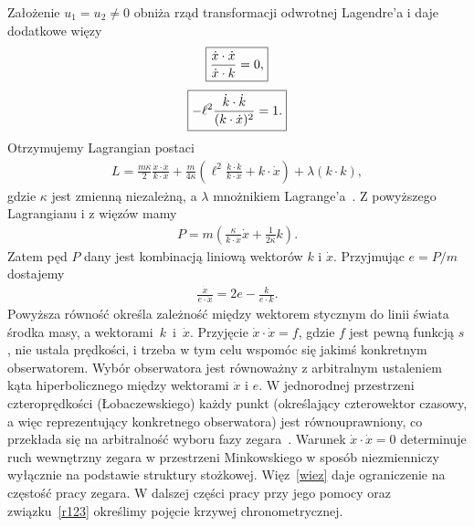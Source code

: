 Założenie 
$u_1 = u_2 \neq 0$ obniża rząd transformacji 
odwrotnej Lagendre'a i daje dodatkowe więzy 
\begin{align}\boxed{
\label{wiezD}
\frac{\dot{x}\cdot\dot{x}}{\dot{x}\cdot k}=0, 
}
\end{align}
\begin{align} 
\boxed{
\label{wiez}
 - \ell^2 \frac{\dot{k} \cdot \dot{k}}{ ( k \cdot \dot{x})^2 } = 1 .
}
\end{align}
Otrzymujemy Lagrangian postaci
\begin{align*}\boxed{
L  = \frac{m \kappa}{2} \frac{\dot{x}\cdot\dot{x}}{k\cdot\dot{x}}
+ \frac{m }{4 \kappa} 
 \left( \ell^2 \frac{\dot{k} \cdot \dot{k}}{  k \cdot \dot{x} } + 
k\cdot\dot{x} \right) + \lambda (k\cdot k),}
\end{align*}
gdzie $\kappa $ jest zmienną niezależną, a $\lambda$ 
mnożnikiem Lagrange'a~\cite{Bratek2015wiele}.
Z powyższego Lagrangianu i z więzów mamy
\begin{align*}
P = m \left( \frac{\kappa}{k\cdot \dot{x}} \dot{x}+ \frac{1}{2\kappa} k\right).
\end{align*}
Zatem pęd $P$ dany jest kombinacją liniową wektorów $k$ i $\dot{x}$. Przyjmując
$e=P/m$ dostajemy
\begin{align}\label{r123}
\frac{\dot{x}}{e\cdot \dot{x}} = 
2 e - \frac{k}{e\cdot k}.
\end{align}
Powyższa równość określa zależność między wektorem 
stycznym do linii świata środka masy, a wektorami~$k$~i~$\dot{x}$.
Przyjęcie $\dot{x} \cdot \dot{x} = f$, gdzie $f$ jest pewną 
funkcją $s$, nie ustala prędkości, 
i trzeba w tym celu wspomóc się jakimś konkretnym obserwatorem.
Wybór obserwatora jest równoważny z arbitralnym ustaleniem 
kąta hiperbolicznego między wektorami $\dot{x}$ 
i $e$. 
W jednorodnej przestrzeni czteroprędkości (Łobaczewskiego) 
każdy punkt
(określający czterowektor czasowy, a więc reprezentujący konkretnego
obserwatora) jest równouprawniony, co przekłada się na arbitralność wyboru
fazy zegara~\cite{Bratek2015wiele}.
Warunek $\dot{x} \cdot \dot{x} = 0$ determinuje ruch wewnętrzny zegara 
w przestrzeni Minkowskiego w sposób niezmienniczy wyłącznie na 
podstawie struktury stożkowej. 
Więz~\eqref{wiez} daje ograniczenie na częstość pracy zegara. 
W dalszej części pracy przy jego pomocy oraz związku~\eqref{r123} 
określimy pojęcie krzywej chronometrycznej.
